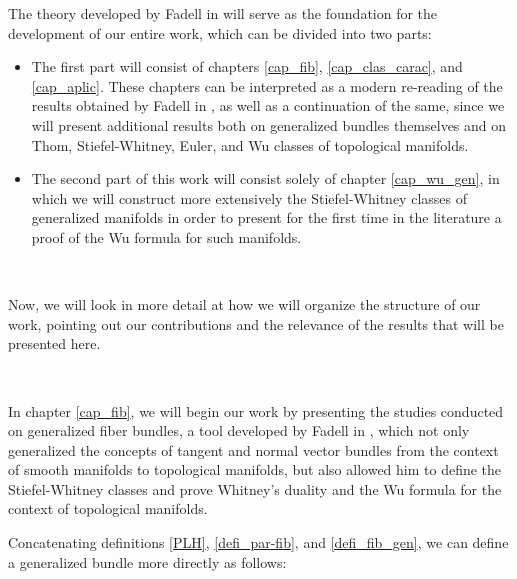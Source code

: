 \documentclass[12pt,oneside]{book}
\begin{document}
    The theory developed by Fadell in \cite{fadell_1} will serve as the foundation for the development 
    of our entire work, which can be divided into two parts:
        \begin{itemize}
            \item The first part will consist of chapters \ref{cap_fib}, \ref{cap_clas_carac}, and 
            \ref{cap_aplic}. These chapters can be interpreted as a modern re-reading of the results 
            obtained by Fadell in \cite{fadell_1}, as well as a continuation of the same, since we will 
            present additional results both on generalized bundles themselves and on Thom, 
            Stiefel-Whitney, Euler, and Wu classes of topological manifolds.
            \item The second part of this work will consist solely of chapter \ref{cap_wu_gen}, in which 
            we will construct more extensively the Stiefel-Whitney classes of generalized manifolds in 
            order to present for the first time in the literature a proof of the Wu formula for such 
            manifolds.
        \end{itemize}
    
        \
    
    Now, we will look in more detail at how we will organize the structure of our work, pointing out our 
    contributions and the relevance of the results that will be presented here.

    \
    
    In chapter \ref{cap_fib}, we will begin our work by presenting the studies conducted on generalized 
    fiber bundles, a tool developed by Fadell in \cite{fadell_1}, which 
    not only generalized the concepts of tangent and normal vector bundles from the context of smooth 
    manifolds to topological manifolds, but also allowed him to define the 
    Stiefel-Whitney classes and prove Whitney's 
    duality and the Wu formula for the context of topological 
    manifolds.
    
    Concatenating definitions \ref{PLH}, \ref{defi_par-fib}, and \ref{defi_fib_gen}, we can define a 
    generalized bundle more directly as follows:

    \
\end{document}
